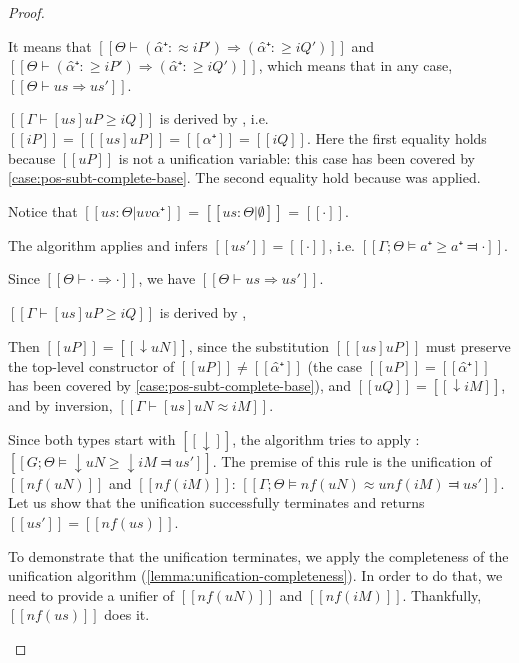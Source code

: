\begin{proof}
\begin{caseof}
        It means that $[[Θ ⊢ (α̂⁺ :≈ iP') ⇒ (α̂⁺ :≥ iQ') ]]$ and 
        $[[ Θ ⊢ (α̂⁺ :≥ iP') ⇒ (α̂⁺ :≥ iQ') ]]$, which means that in any case, 
        $[[ Θ ⊢ us ⇒ us']]$.

        \item \label{case:pos-subt-complete-pvar}
        $[[ Γ ⊢ [us]uP ≥ iQ ]]$ is derived by , 
        i.e. $[[iP]] = [[ [us]uP ]] = [[ α⁺ ]] = [[iQ]]$.
        Here the first equality holds because $[[uP]]$ is not a unification variable:
        this case has been covered by \cref{case:pos-subt-complete-base}.
        The second equality hold because  was applied.

        Notice that $[[us : Θ | uv α⁺]]$ = $[[us : Θ | ∅]]$ = $[[·]]$.

        The algorithm applies  and 
        infers $[[us']] = [[·]]$, i.e. $[[Γ;Θ ⊨ a⁺ ≥ a⁺ ⫤ ·]]$.

        Since $[[Θ ⊢ · ⇒ ·]]$, we have $[[Θ ⊢ us ⇒ us']]$.


        \item \label{case:pos-subt-complete-upshift} $[[ Γ ⊢ [us]uP ≥ iQ ]]$ is derived by ,
        
        Then $[[ uP ]] = [[ ↓uN ]]$, since the substitution $[[ [us]uP ]]$ must preserve the 
        top-level constructor of $[[uP]]\neq [[α̂⁺]]$ (the case $[[uP]] = [[α̂⁺]]$ has been covered
        by \cref{case:pos-subt-complete-base}), and $[[uQ]] = [[ ↓iM ]]$,
        and by inversion, $[[ Γ ⊢ [us]uN ≈ iM ]]$.

        Since both types start with $[[↓]]$, 
        the algorithm tries to apply : 
        $[[G;Θ ⊨ ↓uN ≥ ↓iM ⫤ us']]$. The premise of this rule is the
        unification of $[[nf(uN)]]$ and $[[nf(iM)]]$:
        $[[Γ;Θ ⊨ nf(uN) ≈u nf(iM) ⫤ us']]$. Let us show that the unification successfully 
        terminates and returns $[[us']] = [[nf(us)]]$.

        To demonstrate that the unification terminates, we apply the completeness 
        of the unification algorithm (\cref{lemma:unification-completeness}). 
        In order to do that, we need to provide a unifier of 
        $[[nf(uN)]]$ and $[[nf(iM)]]$. Thankfully, $[[nf(us)]]$ does it. 


\end{caseof}
\end{proof}
